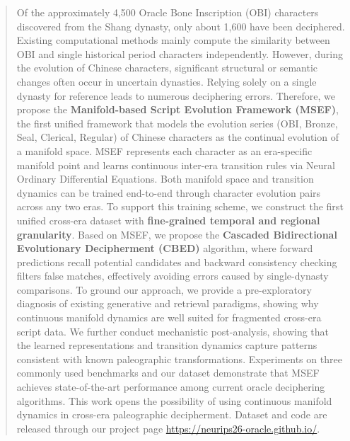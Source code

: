 \documentclass{article}
\begin{document}
\begin{abstract}
    Of the approximately 4,500 Oracle Bone Inscription (OBI) characters discovered from the Shang dynasty, only about 1,600 have been deciphered. 
    Existing computational methods mainly compute the similarity between OBI and single historical period characters independently. 
    However, during the evolution of Chinese characters, significant structural or semantic changes often occur in uncertain dynasties. Relying solely on a single dynasty for reference leads to numerous deciphering errors.
    Therefore, we propose the \textbf{Manifold-based Script Evolution Framework (MSEF)}, the first unified framework that models the evolution series (OBI, Bronze, Seal, Clerical, Regular) of Chinese characters as the continual evolution of a manifold space.
    MSEF represents each character as an era-specific manifold point and learns continuous inter-era transition rules via Neural Ordinary Differential Equations. Both manifold space and transition dynamics can be trained end-to-end through character evolution pairs across any two eras.
    To support this training scheme, we construct the first unified cross-era dataset with \textbf{fine-grained temporal and regional granularity}.
    Based on MSEF, we propose the \textbf{Cascaded Bidirectional Evolutionary Decipherment (CBED)} algorithm, where forward predictions recall potential candidates and backward consistency checking filters false matches, effectively avoiding errors caused by single-dynasty comparisons.
    To ground our approach, we provide a pre-exploratory diagnosis of existing generative and retrieval paradigms, showing why continuous manifold dynamics are well suited for fragmented cross-era script data. We further conduct mechanistic post-analysis, showing that the learned representations and transition dynamics capture patterns consistent with known paleographic transformations.
    Experiments on three commonly used benchmarks and our dataset demonstrate that MSEF achieves state-of-the-art performance among current oracle deciphering algorithms. This work opens the possibility of using continuous manifold dynamics in cross-era paleographic decipherment. Dataset and code are released through our project page \url{https://neurips26-oracle.github.io/}.
\end{abstract}




\end{document}
